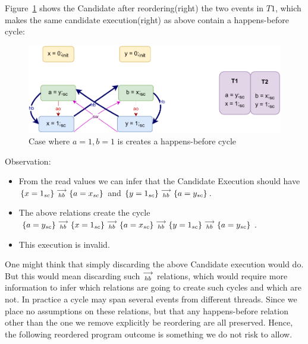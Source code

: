         Figure~\ref{reord_counter:example3(b)} shows the Candidate after reordering(right) the two events in $T1$, which makes the same candidate execution(right) as above contain a happens-before cycle:
        \begin{figure}[H]
            \centering
            \includegraphics[scale=0.7]{7.CounterExamples/ReorderingCandidate/Example5R(Wsc-Rsc).pdf}
            \caption{Case where $a = 1, b = 1$ is creates a happens-before cycle}
            \label{reord_counter:example3(b)}
        \end{figure}

        Observation:
        \begin{itemize}
            \item From the read values we can infer that the Candidate Execution should have $\{x=1_{sc}\}\stackrel{\longrightarrow}{_{hb}}\{a=x_{sc}\}$ and $\{y=1_{sc}\}\stackrel{\longrightarrow}{_{hb}}\{a=y_{sc}\}$.
            \item The above relations create the cycle $\{a=y_{sc}\}\stackrel{\longrightarrow}{_{hb}}\{x=1_{sc}\}\stackrel{\longrightarrow}{_{hb}}\{a=x_{sc}\}\stackrel{\longrightarrow}{_{hb}}\{y=1_{sc}\}\stackrel{\longrightarrow}{_{hb}}\{a=y_{sc}\}$.
            \item This execution is invalid. 
        \end{itemize}

        One might think that simply discarding the above Candidate execution would do. 
        But this would mean discarding such $\stackrel{\longrightarrow}{_{hb}}$ relations, which would require more information to infer which relations are going to create such cycles and which are not. 
        In practice a cycle may span several events from different threads.
        Since we place no assumptions on these relations, but that any happens-before relation other than the one we remove explicitly be reordering are all preserved. 
        Hence, the following reordered program outcome is something we do not risk to allow.


